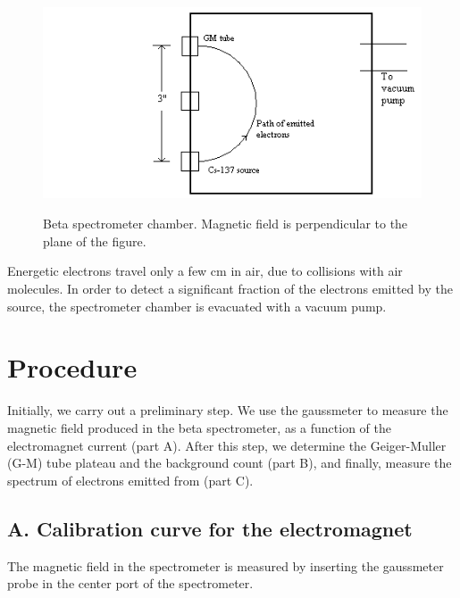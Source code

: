 \begin{figure}
\begin{centering}
\includegraphics[width=4.9992in,height=2.528in]{../images/beta-img5.png} 
\caption{Beta spectrometer chamber.  Magnetic field is perpendicular to the plane of the figure.}
\label{fig:chamber}
\end{centering}
\end{figure}

Energetic electrons travel only a few cm in air, due to collisions with
air molecules.  In order to detect a significant fraction of the
electrons emitted by the \cs source, the spectrometer chamber is
evacuated with a vacuum pump.

\section{Procedure}

Initially, we carry out a preliminary step.  We use the gaussmeter
to measure the magnetic field produced in the beta spectrometer, as a
function of the electromagnet current (part A).  After this step, we
determine the Geiger-Muller (G-M) tube plateau and the background count
(part B), and finally, measure the spectrum of electrons emitted from
\cs (part C).

\subsection{A. Calibration curve for the electromagnet}

The magnetic field in the spectrometer is measured by inserting the gaussmeter
probe in the center port of the spectrometer.

